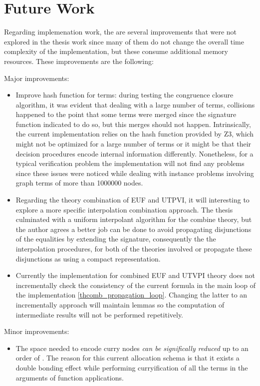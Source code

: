 \chapter{Future Work}

Regarding implemenation work, the are several improvements that were not explored 
in the thesis work since many of them do not change the overall time complexity 
of the implementation, but these consume additional memory resources. 
These improvements are the following:

Major improvements:

\begin{itemize}
  \item Improve hash function for terms: during testing the congruence closure
    algorithm, it was evident that dealing with a large number of terms, collisions
    happened  to the point that some terms were merged since the signature
    function indicated to do so, but this merges should not happen. 
    Intrinsically, the current implementation relies on the hash function 
    provided by Z3, which might not be optimized
    for a large number of terms or it might
    be that their decision procedures
    encode internal information differently.
    Nonetheless, for
    a typical verification problem the implementation will not 
    find any problems since these
    issues were noticed while dealing with
    instance problems involving graph terms
    of more than 1000000 nodes.
  \item Regarding the theory combination 
    of EUF and UTPVI, it will interesting 
    to explore a
    more specific interpolation 
    combination approach. The thesis 
    culminated with a 
    uniform interpolant algorithm for the
    combine theory, but the author agrees 
    a better job can be done to avoid 
    propagating disjunctions of the equalities
    by extending the signature, 
    consequently the the interpolation 
    procedures, for both of the theories 
    involved or propagate these disjunctions as
    using a compact representation.
  \item Currently the implementation for combined EUF and UTVPI 
    theory does not incrementally check the 
    consistency of the current formula in the main loop of 
    the implementation \ref{thcomb_propagation_loop}. 
    Changing the latter to an incrementally approach will
    maintain lemmas so the computation of intermediate results
    will not be performed repetitively. 
\end{itemize}

Minor improvements:

\begin{itemize}
  \item The space needed to encode curry nodes \emph{can be significally 
    reduced} up to an order of . The reason for 
    this current allocation schema is that it exists a 
    double bonding effect while performing curryification 
    of all the terms in the arguments of function applications.
\end{itemize}


